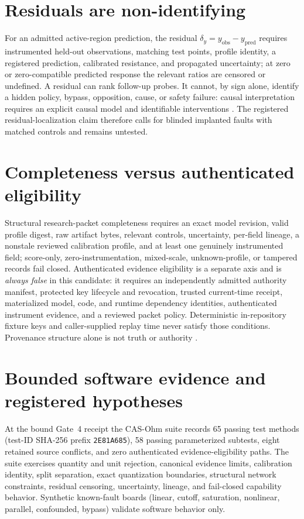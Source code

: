 \documentclass[11pt]{amsart}
\theoremstyle{definition}
\theoremstyle{remark}
\begin{document}
\section{Residuals are non-identifying}\label{sec:residuals}

For an admitted active-region prediction, the residual $\delta_y = y_{\mathrm{obs}} - y_{\mathrm{pred}}$ requires instrumented held-out observations, matching test points, profile identity, a registered prediction, calibrated resistance, and propagated uncertainty; at zero or zero-compatible predicted response the relevant ratios are censored or undefined. A residual can rank follow-up probes. It cannot, by sign alone, identify a hidden policy, bypass, opposition, cause, or safety failure: causal interpretation requires an explicit causal model and identifiable interventions \cite{pearl}. The registered residual-localization claim therefore calls for blinded implanted faults with matched controls and remains untested.

\section{Completeness versus authenticated eligibility}

Structural research-packet completeness requires an exact model revision, valid profile digest, raw artifact bytes, relevant controls, uncertainty, per-field lineage, a nonstale reviewed calibration profile, and at least one genuinely instrumented field; score-only, zero-instrumentation, mixed-scale, unknown-profile, or tampered records fail closed. Authenticated evidence eligibility is a separate axis and is \emph{always false} in this candidate: it requires an independently admitted authority manifest, protected key lifecycle and revocation, trusted current-time receipt, materialized model, code, and runtime dependency identities, authenticated instrument evidence, and a reviewed packet policy. Deterministic in-repository fixture keys and caller-supplied replay time never satisfy those conditions. Provenance structure alone is not truth or authority \cite{prov}.

\section{Bounded software evidence and registered hypotheses}

At the bound Gate~4 receipt the CAS-Ohm suite records 65 passing test methods (test-ID SHA-256 prefix \texttt{2E81A685}), 58 passing parameterized subtests, eight retained source conflicts, and zero authenticated evidence-eligibility paths. The suite exercises quantity and unit rejection, canonical evidence limits, calibration identity, split separation, exact quantization boundaries, structural network constraints, residual censoring, uncertainty, lineage, and fail-closed capability behavior. Synthetic known-fault boards (linear, cutoff, saturation, nonlinear, parallel, confounded, bypass) validate software behavior only.
\end{document}
